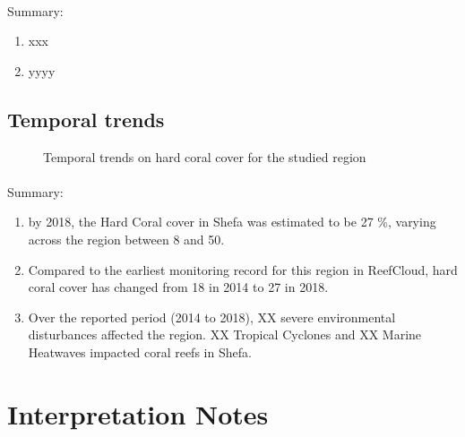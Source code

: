 \documentclass[
  letterpaper,
  DIV=11,
  numbers=noendperiod]{scrartcl}
\makeatletter
\let\oldparagraph\paragraph
\renewcommand{\paragraph}{
    \@ifstar
      \xxxParagraphStar
      \xxxParagraphNoStar
  }
\newcommand{\xxxParagraphStar}[1]{\oldparagraph*{#1}\mbox{}}
\newcommand{\xxxParagraphNoStar}[1]{\oldparagraph{#1}\mbox{}}
\providecommand{\tightlist}{%
  \setlength{\itemsep}{0pt}\setlength{\parskip}{0pt}}\usepackage{longtable,booktabs,array}
\makeatother
\begin{document}
\paragraph{Summary:}\label{summary-1}

\begin{enumerate}
\def\labelenumi{\arabic{enumi}.}
\tightlist
\item
  xxx
\item
  yyyy
\end{enumerate}

\pagebreak

\subsection{Temporal trends}\label{temporal-trends}

\begin{figure}[H]


\caption{\label{fig-temp_trend}Temporal trends on hard coral cover for
the studied region}

\end{figure}%

\paragraph{Summary:}\label{summary-2}

\begin{enumerate}
\def\labelenumi{\arabic{enumi}.}
\tightlist
\item
  by 2018, the Hard Coral cover in Shefa was estimated to be 27 \%,
  varying across the region between 8 and 50.
\item
  Compared to the earliest monitoring record for this region in
  ReefCloud, hard coral cover has changed from 18 in 2014 to 27 in 2018.
\item
  Over the reported period (2014 to 2018), XX severe environmental
  disturbances affected the region. XX Tropical Cyclones and XX Marine
  Heatwaves impacted coral reefs in Shefa.
\end{enumerate}

\pagebreak

\section{Interpretation Notes}\label{interpretation-notes}
\end{document}
